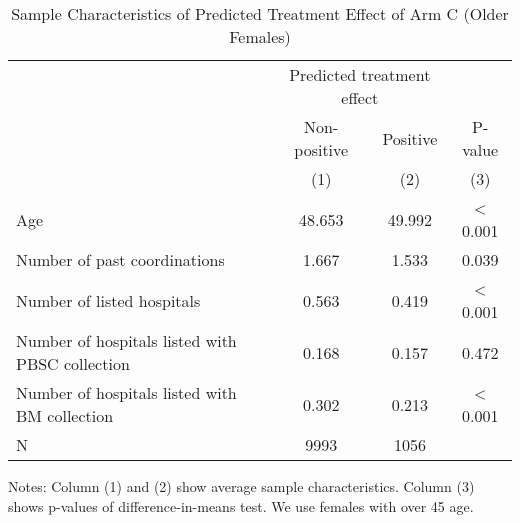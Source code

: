 \documentclass[
  11pt,
  a4paper
]{article}
\begin{document}
\begin{table}[H]

\caption{\label{tab:rcf-older-female}Sample Characteristics of Predicted Treatment Effect of Arm C (Older Females)}
\centering
\fontsize{9}{11}\selectfont
\fontsize{9}{11}\selectfont
\begin{threeparttable}
\begin{tabular}[t]{lccc}
\toprule
\multicolumn{1}{c}{ } & \multicolumn{2}{c}{Predicted treatment effect} & \multicolumn{1}{c}{ } \\
\cmidrule(l{3pt}r{3pt}){2-3}
\multicolumn{1}{c}{ } & \multicolumn{1}{c}{Non-positive} & \multicolumn{1}{c}{Positive} & \multicolumn{1}{c}{P-value} \\
\cmidrule(l{3pt}r{3pt}){2-2} \cmidrule(l{3pt}r{3pt}){3-3} \cmidrule(l{3pt}r{3pt}){4-4}
 & (1) & (2) & (3)\\
\midrule
Age & 48.653 & 49.992 & < 0.001\\
Number of past coordinations & 1.667 & 1.533 & 0.039\\
Number of listed hospitals & 0.563 & 0.419 & < 0.001\\
Number of hospitals listed with PBSC collection & 0.168 & 0.157 & 0.472\\
Number of hospitals listed with BM collection & 0.302 & 0.213 & < 0.001\\
N & 9993 & 1056 & \\
\bottomrule
\end{tabular}
\begin{tablenotes}
\item Notes: Column (1) and (2) show average sample characteristics. Column (3) shows p-values of difference-in-means test. We use females with over 45 age.
\end{tablenotes}
\end{threeparttable}
\end{table}

\clearpage

\clearpage


\end{document}
